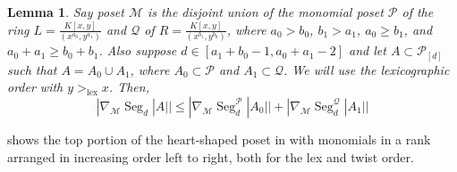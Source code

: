 \documentclass[11pt, reqno]{amsart}
\newcommand{\Q}{{\mathcal Q}}
\renewcommand{\P}{{\mathcal P}}
\def\lex{\operatorname{lex}}
\def\Seg{\operatorname{Seg}}
\theoremstyle{plain} %
\newtheorem{lem}[thm]{Lemma}
\theoremstyle{definition}
\theoremstyle{remark}
\numberwithin{equation}{section}  %
\begin{document}
\begin{lem}
\label{lemma:initial segments general}
    Say poset $\mathcal{M}$ is the disjoint union of the monomial poset $\P$ of  the ring $L=\frac{K[x,y]}{(x^{a_0},y^{a_1})}$ and  $\Q$ of $R=\frac{K[x,y]}{(x^{b_1},y^{b_0})}$, where $a_0 > b_0$, $b_1 > a_1$, $a_0 \geq b_1$, and $a_0+a_1 \geq b_0+b_1$. %
    Also suppose $d \in [a_1+b_0-1,a_0+a_1-2]$ and let $A \subset \mathcal{P}_{[d]}$ such that $A = A_0 \cup A_1$, where $A_0 \subset \P$ and $A_1 \subset \Q$. We will use the lexicographic order with $y >_{\lex} x$.  Then, 
    \[|\nabla_{\mathcal{M}}\Seg_d |A|| \leq |\nabla_{\mathcal{M}}\Seg_d^{\P}|A_0|| + |\nabla_{\mathcal{M}}\Seg_d^{\Q}|A_1||\]
\end{lem}

 shows the top portion of the heart-shaped poset in  with monomials in a rank arranged in increasing order left to right, both for the lex and twist order.
\end{document}
